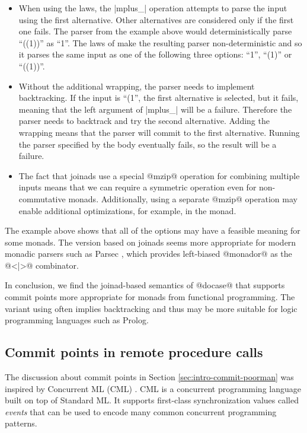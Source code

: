 \documentclass[preprint]{sigplanconf}
\begin{document}
\begin{itemize}
\item When using the  laws, the |mplus_| operation attempts to parse the input using the
  first alternative. Other alternatives are considered only if the first one fails. The parser from 
  the example above would deterministically parse ``((1))'' as ``1''. The laws of  
  make the resulting parser non-deterministic and so it parses the same input as one of the following
  three options: ``1'', ``(1)'' or ``((1))''.

\item Without the additional wrapping, the parser needs to implement backtracking. If the
  input is ``(1'', the first alternative is selected, but it fails, meaning that the left argument of 
  |mplus_| will be a failure. Therefore the parser needs to backtrack and try the second alternative. 
  Adding the wrapping means that the parser will commit to the first alternative. Running the parser
  specified by the body eventually fails, so the result will be a failure.

\item The fact that joinads use a special @mzip@ operation for combining multiple inputs means that 
  we can require a symmetric operation even for non-commutative monads. Additionally, using a 
  separate @mzip@ operation may enable additional optimizations, for example, in the  monad.

\end{itemize}
The example above shows that all of the options may have a feasible meaning for some monads. The 
version based on joinads seems more appropriate for modern monadic parsers such as Parsec 
\cite{parsec}, which provides left-biased @monador@ as the @<|>@ combinator.

In conclusion, we find the joinad-based semantics of @docase@ that supports commit points more 
appropriate for monads from functional programming. The variant using  often 
implies backtracking and thus may be more suitable for logic programming languages such as Prolog. 


\subsection{Commit points in remote procedure calls}
The discussion about commit points in Section \ref{sec:intro-commit-poorman} was inspired by 
Concurrent ML (CML) \cite{concurrentml}. CML is a concurrent programming language built on top
of Standard ML. It supports first-class synchronization values called \textit{events} that can 
be used to encode many common concurrent programming patterns.
\end{document}
